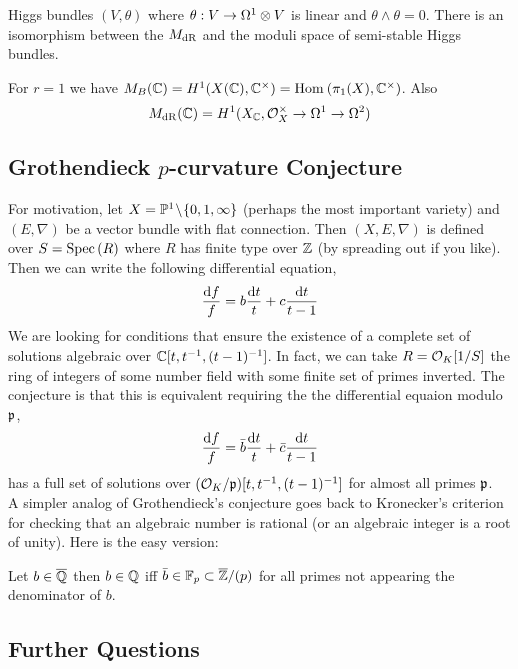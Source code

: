 \documentclass[12pt]{article}
\begin{document}
\begin{theorem}[Simpson, '90s] Higgs bundles $(V, \theta)$ where $\theta : V \to \Omega^1 \otimes V$ is linear and $\theta \wedge \theta = 0$. There is an isomorphism between the $M_{\mathrm{dR}}$ and the moduli space of semi-stable Higgs bundles.
\end{theorem}

\begin{example}
For $r = 1$ we have $M_B(\mathbb{C}) = H^1(X(\mathbb{C}), \mathbb{C}^\times) = \mathrm{Hom}_{} \left( \pi_1(X), \mathbb{C}^\times \right)$. Also
\[ M_{\mathrm{dR}}(\mathbb{C}) = H^1(X_{\mathbb{C}}, \mathcal{O}_{X}^\times \to \Omega^1 \to \Omega^2) \] 
\end{example}

\subsection{Grothendieck $p$-curvature Conjecture}

For motivation, let $X = \mathbb{P}^1 \! \setminus \! \{ 0,1, \infty \}$ (perhaps the most important variety) and $(E, \nabla)$ be a vector bundle with flat connection. Then $(X, E, \nabla)$ is defined over $S = \mathrm{Spec}\left( R \right)$ where $R$ has finite type over $\mathbb{Z}$ (by spreading out if you like). Then we can write the following differential equation,
\[ \frac{\mathrm{d}{f}}{f} = b \frac{\mathrm{d}{t}}{t} + c \frac{\mathrm{d}{t}}{t - 1} \]
We are looking for conditions that ensure the existence of a complete set of solutions algebraic over $\mathbb{C}[t, t^{-1}, (t-1)^{-1}]$. In fact, we can take $R = \mathcal{O}_{K}[1/S]$ the ring of integers of some number field with some finite set of primes inverted. The conjecture is that this is equivalent requiring the the differential equaion modulo $\mathfrak{p}$,
\[ \frac{\mathrm{d}{f}}{f} = \bar{b} \frac{\mathrm{d}{t}}{t} + \bar{c} \frac{\mathrm{d}{t}}{t-1} \]
has a full set of solutions over $(\mathcal{O}_{K} / \mathfrak{p})[t, t^{-1}, (t-1)^{-1}]$ for almost all primes $\mathfrak{p}$.
\bigskip\\
A simpler analog of Grothendieck's conjecture goes back to Kronecker's criterion for checking that an algebraic number is rational (or an algebraic integer is a root of unity). Here is the easy version:
\begin{center}
Let $b \in \overline{\mathbb{Q}}$ then $b \in \mathbb{Q}$ iff $\bar{b} \in \mathbb{F}_p \subset \overline{\mathbb{Z}} / (p)$ for all primes not appearing the denominator of $b$.
\end{center}

\subsection{Further Questions}
\end{document}
